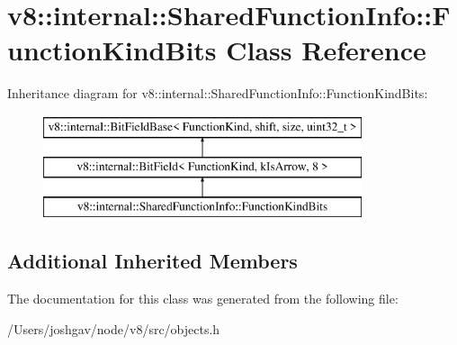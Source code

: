 \hypertarget{classv8_1_1internal_1_1_shared_function_info_1_1_function_kind_bits}{}\section{v8\+:\+:internal\+:\+:Shared\+Function\+Info\+:\+:Function\+Kind\+Bits Class Reference}
\label{classv8_1_1internal_1_1_shared_function_info_1_1_function_kind_bits}
Inheritance diagram for v8\+:\+:internal\+:\+:Shared\+Function\+Info\+:\+:Function\+Kind\+Bits\+:\begin{figure}[H]
\begin{center}
\leavevmode
\includegraphics[height=3.000000cm]{classv8_1_1internal_1_1_shared_function_info_1_1_function_kind_bits}
\end{center}
\end{figure}
\subsection*{Additional Inherited Members}


The documentation for this class was generated from the following file\+:\begin{DoxyCompactItemize}
\item 
/\+Users/joshgav/node/v8/src/objects.\+h\end{DoxyCompactItemize}
